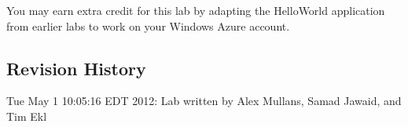 \documentclass{article}
\begin{document}
You may earn extra credit for this lab by adapting the HelloWorld application from earlier labs to work on your Windows Azure account.



\subsection*{Revision History}
\begin{itemize*}
\item Tue May  1 10:05:16 EDT 2012: Lab written by Alex Mullans, Samad Jawaid, and Tim Ekl
\end{itemize*}
\end{document}
